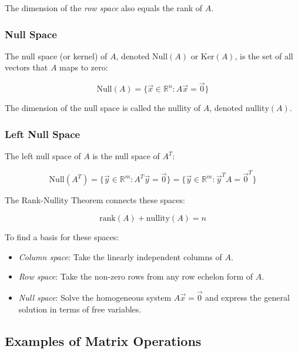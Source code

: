 The dimension of the \emph{row space} also equals the rank of \(A\).

\subsubsection{Null Space}

The null space (or kernel) of \(A\), denoted \(\text{Null}(A)\) or \(\text{Ker}(A)\), 
is the set of all vectors that \(A\) maps to zero:

\begin{equation*}
\text{Null}(A) = \{\vec{x} \in \mathbb{R}^n : A\vec{x} = \vec{0}\}
\end{equation*}

The dimension of the null space is called the nullity of \(A\), denoted \(\text{nullity}(A)\).

\subsubsection{Left Null Space}

The left null space of \(A\) is the null space of \(A^T\):

\begin{equation*}
\text{Null}(A^T) = \{\vec{y} \in \mathbb{R}^m : A^T\vec{y} = \vec{0}\} = \{\vec{y} \in \mathbb{R}^m : \vec{y}^T A = \vec{0}^T\}
\end{equation*}

The Rank-Nullity Theorem connects these spaces:

\begin{equation*}
\text{rank}(A) + \text{nullity}(A) = n
\end{equation*}

To find a basis for these spaces:
\begin{itemize}[label=\(-\)]
    \item \emph{Column space}: Take the linearly independent columns of \(A\).
    \item \emph{Row space}: Take the non-zero rows from any row echelon form of \(A\).    
    \item \emph{Null space}: Solve the homogeneous system \(A\vec{x} = \vec{0}\) and express the general 
    solution in terms of free variables.
\end{itemize}
\subsection{Examples of Matrix Operations}

